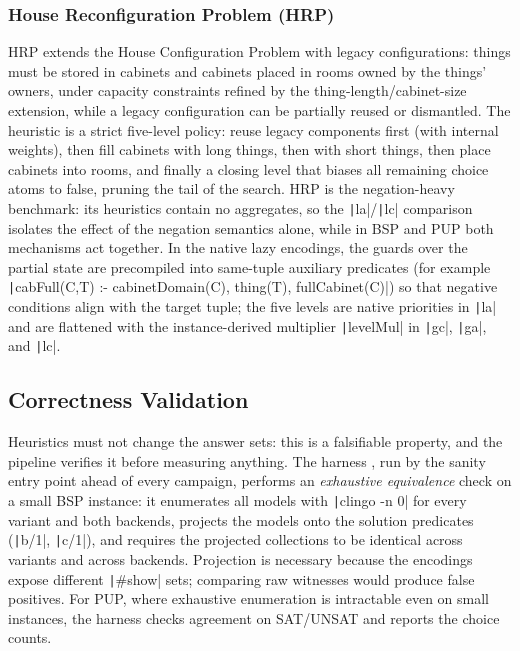 \subsubsection{House Reconfiguration Problem (HRP)}

HRP extends the House Configuration Problem with legacy configurations: things must be stored in cabinets and cabinets placed in rooms owned by the things' owners, under capacity constraints refined by the thing-length/cabinet-size extension, while a legacy configuration can be partially reused or dismantled. The heuristic is a strict five-level policy: reuse legacy components first (with internal weights), then fill cabinets with long things, then with short things, then place cabinets into rooms, and finally a closing level that biases all remaining choice atoms to false, pruning the tail of the search. HRP is the negation-heavy benchmark: its heuristics contain no aggregates, so the \texttt|la|/\texttt|lc| comparison isolates the effect of the negation semantics alone, while in BSP and PUP both mechanisms act together. In the native lazy encodings, the guards over the partial state are precompiled into same-tuple auxiliary predicates (for example \texttt|cabFull(C,T) :- cabinetDomain(C), thing(T), fullCabinet(C)|) so that negative conditions align with the target tuple; the five levels are native priorities in \texttt|la| and are flattened with the instance-derived multiplier \texttt|levelMul| in \texttt|gc|, \texttt|ga|, and \texttt|lc|.

\subsection{Correctness Validation}
\label{sec:validation}

Heuristics must not change the answer sets: this is a falsifiable property, and the pipeline verifies it before measuring anything. The harness , run by the sanity entry point ahead of every campaign, performs an \emph{exhaustive equivalence} check on a small BSP instance: it enumerates all models with \texttt|clingo -n 0| for every variant and both backends, projects the models onto the solution predicates (\texttt|b/1|, \texttt|c/1|), and requires the projected collections to be identical across variants and across backends. Projection is necessary because the encodings expose different \texttt|#show| sets; comparing raw witnesses would produce false positives. For PUP, where exhaustive enumeration is intractable even on small instances, the harness checks agreement on SAT/UNSAT and reports the choice counts.


